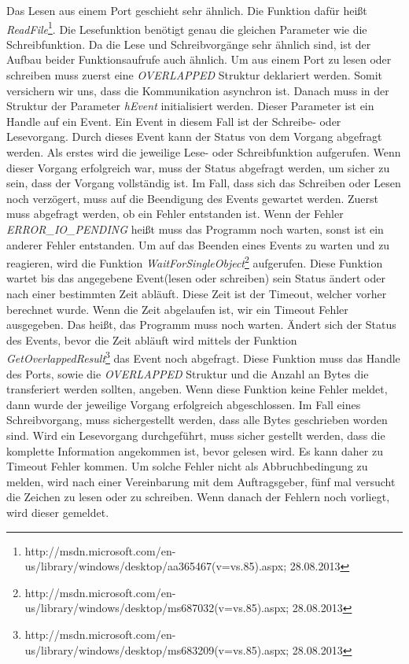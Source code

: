 Das Lesen aus einem Port geschieht sehr ähnlich. Die Funktion dafür heißt \textit{ReadFile}\footnote{http://msdn.microsoft.com/en-us/library/windows/desktop/aa365467(v=vs.85).aspx; 28.08.2013}. Die Lesefunktion benötigt genau die gleichen Parameter wie die Schreibfunktion. Da die Lese und Schreibvorgänge sehr ähnlich sind, ist der Aufbau beider Funktionsaufrufe auch ähnlich. Um aus einem Port zu lesen oder schreiben muss zuerst eine \textit{OVERLAPPED} Struktur deklariert werden. Somit versichern wir uns, dass die Kommunikation asynchron ist. Danach muss in der Struktur der Parameter \textit{hEvent} initialisiert werden. Dieser Parameter ist ein Handle auf ein Event. Ein Event in diesem Fall ist der Schreibe- oder Lesevorgang. Durch dieses Event kann der Status von dem Vorgang abgefragt werden. Als erstes wird die jeweilige Lese- oder Schreibfunktion aufgerufen. Wenn dieser Vorgang erfolgreich war, muss der Status abgefragt werden, um sicher zu sein, dass der Vorgang vollständig ist. Im Fall, dass sich das Schreiben oder Lesen noch verzögert, muss auf die Beendigung des Events gewartet werden. Zuerst muss abgefragt werden, ob ein Fehler entstanden ist. Wenn der Fehler \textit{ERROR\_IO\_PENDING} heißt muss das Programm noch warten, sonst ist ein anderer Fehler entstanden. Um auf das Beenden eines Events zu warten und zu reagieren, wird die Funktion \textit{WaitForSingleObject}\footnote{http://msdn.microsoft.com/en-us/library/windows/desktop/ms687032(v=vs.85).aspx; 28.08.2013} aufgerufen. Diese Funktion wartet bis das angegebene Event(lesen oder schreiben) sein Status ändert oder nach einer bestimmten Zeit abläuft. Diese Zeit ist der Timeout, welcher vorher berechnet wurde. Wenn die Zeit abgelaufen ist, wir ein Timeout Fehler ausgegeben. Das heißt, das Programm muss noch warten. Ändert sich der Status des Events, bevor die Zeit abläuft wird mittels der Funktion \textit{GetOverlappedResult}\footnote{http://msdn.microsoft.com/en-us/library/windows/desktop/ms683209(v=vs.85).aspx; 28.08.2013} das Event noch abgefragt. Diese Funktion muss das Handle des Ports, sowie die \textit{OVERLAPPED} Struktur und die Anzahl an Bytes die transferiert werden sollten, angeben. Wenn diese Funktion keine Fehler meldet, dann wurde der jeweilige Vorgang erfolgreich abgeschlossen. Im Fall eines Schreibvorgang, muss sichergestellt werden, dass alle Bytes geschrieben worden sind. Wird ein Lesevorgang durchgeführt, muss sicher gestellt werden, dass die komplette Information angekommen ist, bevor gelesen wird. Es kann daher zu Timeout Fehler kommen. Um solche Fehler nicht als Abbruchbedingung zu melden, wird nach einer Vereinbarung mit dem Auftragsgeber, fünf mal versucht die Zeichen zu lesen oder zu schreiben. Wenn danach der Fehlern noch vorliegt, wird dieser gemeldet.